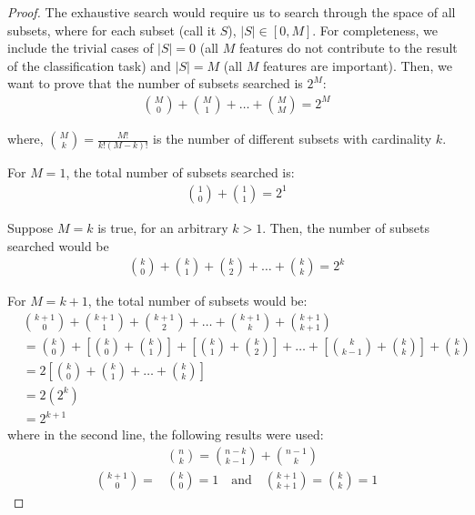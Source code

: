 \documentclass[12pt, twoside, a4paper]{report}
\begin{document}
\begin{proof}
The exhaustive search would require us to search through the space of all subsets, where for each subset (call it $S$), $|S| \in \left[ 0, M \right]$. For completeness, we include the trivial cases of $|S|=0$ (all $M$ features do not contribute to the result of the classification task) and $|S|=M$ (all $M$ features are important). Then, we want to prove that the number of subsets searched is $2^M$:
\begin{align*}
{{M}\choose{0}} + {{M}\choose{1}} + \dots + {{M}\choose{M}} = 2^M
\end{align*}

where, ${{M}\choose{k}} = \frac{M!}{k!(M-k)!}$ is the number of different subsets with cardinality $k$. 

For $M=1$, the total number of subsets searched is:
\begin{align*}
{{1}\choose{0}} + {{1}\choose{1}} = 2^1
\end{align*}

Suppose $M=k$ is true, for an arbitrary $k>1$. Then, the number of subsets searched would be
\begin{align*}
{{k}\choose{0}} + {{k}\choose{1}} + {{k}\choose{2}} + \dots + {{k}\choose{k}} = 2^k 
\end{align*}

For $M=k+1$, the total number of subsets would be:
\begin{align*}
&{{k+1}\choose{0}} + {{k+1}\choose{1}} + {{k+1}\choose{2}} + \dots + {{k+1}\choose{k}} + {{k+1}\choose{k+1}} \\
&= {{k}\choose{0}} + \left[ {{k}\choose{0}} + {{k}\choose{1}} \right] + \left[ {{k}\choose{1}} + {{k}\choose{2}} \right] + \dots + \left[ {{k}\choose{k-1}} + {{k}\choose{k}} \right] + {{k}\choose{k}} \\
&= 2 \left[ {{k}\choose{0}} + {{k}\choose{1}} + \dots + {{k}\choose{k}} \right] \\
&= 2 \left(2^k \right) \\
&= 2^{k+1}
\end{align*}
where in the second line, the following results were used:
\begin{align*}
&{{n}\choose{k}} = {{n-k}\choose{k-1}} + {{n-1}\choose{k}} \\
{{k+1}\choose{0}} = &{{k}\choose{0}} = 1 \quad \text{and} \quad {{k+1}\choose{k+1}} = {{k}\choose{k}} = 1
\end{align*}
\end{proof}
\end{document}
